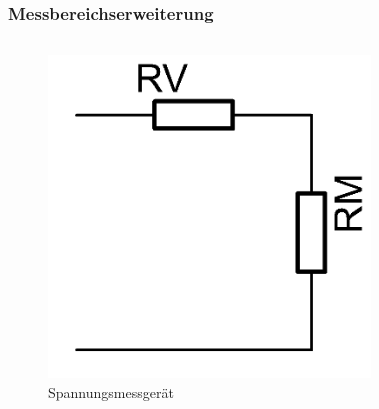 \begin{frame}
  \frametitle{Messbereichserweiterung}
  \begin{columns}
    \begin{center}
      \begin{figure}
        \includegraphics[width=\textwidth,height=.4\textheight,keepaspectratio]{a16/Messbereichserweiterung-Spannung.png}
        \caption{Spannungsmessgerät}
      \end{figure}
    \end{center}
    \begin{center}
      \begin{figure}

\end{figure}
\end{center}
\end{columns}
\end{frame}
